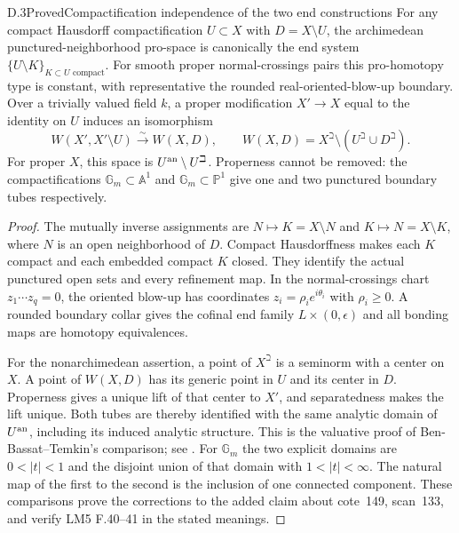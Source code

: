 \begin{result}{D.3}{Proved}{Compactification independence of the two end constructions}
For any compact Hausdorff compactification $U\subset X$ with $D=X\setminus U$, the archimedean punctured-neighborhood pro-space is canonically the end system $\{U\setminus K\}_{K\subset U\text{ compact}}$. For smooth proper normal-crossings pairs this pro-homotopy type is constant, with representative the rounded real-oriented-blow-up boundary. Over a trivially valued field $k$, a proper modification $X'\to X$ equal to the identity on $U$ induces an isomorphism
\[
 W(X',X'\setminus U)\xrightarrow{\ \sim\ }W(X,D),\qquad
 W(X,D)=X^{\beth}\setminus(U^{\beth}\cup D^{\beth}).
\]
For proper $X$, this space is $U^{\rm an}\setminus U^{\beth}$. Properness cannot be removed: the compactifications $\mathbb G_m\subset\mathbb A^1$ and $\mathbb G_m\subset\mathbb P^1$ give one and two punctured boundary tubes respectively.
\end{result}
\begin{proof}
The mutually inverse assignments are $N\mapsto K=X\setminus N$ and $K\mapsto N=X\setminus K$, where $N$ is an open neighborhood of $D$. Compact Hausdorffness makes each $K$ compact and each embedded compact $K$ closed. They identify the actual punctured open sets and every refinement map. In the normal-crossings chart $z_1\cdots z_q=0$, the oriented blow-up has coordinates $z_i=\rho_i e^{i\theta_i}$ with $\rho_i\geq0$. A rounded boundary collar gives the cofinal end family $L\times(0,\epsilon)$ and all bonding maps are homotopy equivalences.

For the nonarchimedean assertion, a point of $X^{\beth}$ is a seminorm with a center on $X$. A point of $W(X,D)$ has its generic point in $U$ and its center in $D$. Properness gives a unique lift of that center to $X'$, and separatedness makes the lift unique. Both tubes are thereby identified with the same analytic domain of $U^{\rm an}$, including its induced analytic structure. This is the valuative proof of Ben-Bassat--Temkin's comparison; see \cite[\S3.3.2 and Proposition~4.5.1]{BBT2013}. For $\mathbb G_m$ the two explicit domains are $0<|t|<1$ and the disjoint union of that domain with $1<|t|<\infty$. The natural map of the first to the second is the inclusion of one connected component. These comparisons prove the corrections to the added claim about cote~149, scan~133, and verify LM5 F.40--41 in the stated meanings.
\end{proof}

